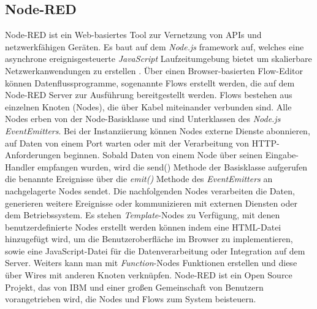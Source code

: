 \documentclass[BMR,Bachelor,ngerman]{twbook}%
\begin{document}
\subsection{Node-RED}
Node-RED ist ein Web-basiertes Tool zur Vernetzung von \acp{API} und netzwerkfähigen Geräten. Es baut auf dem \emph{Node.js} framework auf, welches eine asynchrone ereignisgesteuerte \emph{JavaScript} Laufzeitumgebung bietet um skalierbare Netzwerkanwendungen zu erstellen \cite{nodejs2018}. Über einen Browser-basierten Flow-Editor können Datenflussprogramme, sogenannte Flows erstellt werden, die auf dem Node-RED Server zur Ausführung bereitgestellt werden. Flows bestehen aus einzelnen Knoten (Nodes), die über Kabel miteinander verbunden sind. Alle Nodes erben von der Node-Basisklasse und sind Unterklassen des \emph{Node.js} \emph{EventEmitters}. Bei der Instanziierung können Nodes externe Dienste abonnieren, auf Daten von einem Port warten oder mit der Verarbeitung von \ac{HTTP}-Anforderungen beginnen. Sobald Daten von einem Node über seinen Eingabe-Handler empfangen wurden, wird die send() Methode der Basisklasse aufgerufen die benannte Ereignisse über die \emph{emit()} Methode des \emph{EventEmitters} an nachgelagerte Nodes sendet. Die nachfolgenden Nodes verarbeiten die Daten, generieren weitere Ereignisse oder kommunizieren mit externen Diensten oder dem Betriebssystem. Es stehen \emph{Template}-Nodes zu Verfügung, mit denen benutzerdefinierte Nodes erstellt werden können indem eine HTML-Datei hinzugefügt wird, um die Benutzeroberfläche im Browser zu implementieren, sowie eine JavaScript-Datei für die Datenverarbeitung oder Integration auf dem Server. Weiters kann man mit \emph{Function}-Nodes Funktionen erstellen und diese über Wires mit anderen Knoten verknüpfen. Node-RED ist ein Open Source Projekt, das von IBM und einer großen Gemeinschaft von Benutzern vorangetrieben wird, die Nodes und Flows zum System beisteuern. \cite{giang2014toward}
\end{document}
